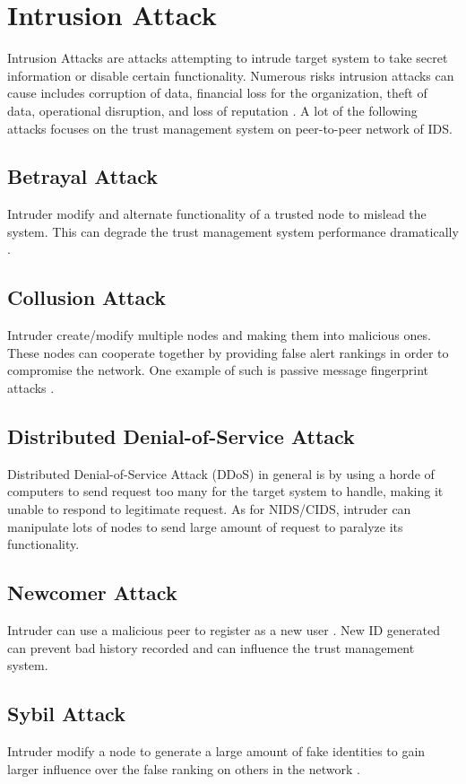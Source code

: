 \documentclass[12pt]{report}
\begin{document}
\section{Intrusion Attack}
Intrusion Attacks are attacks attempting to intrude target system to take secret information or disable certain functionality. Numerous risks intrusion attacks can cause includes corruption of data, financial loss for the organization, theft of data, operational disruption, and loss of reputation \cite{zenarmor_network_intrusion}. A lot of the following attacks focuses on the trust management system on peer-to-peer network of IDS.

\subsection{Betrayal Attack}
Intruder modify and alternate functionality of a trusted node to mislead the system. This can degrade the trust management system performance dramatically \cite{5188784}.

\subsection{Collusion Attack}
Intruder create/modify multiple nodes and making them into malicious ones. These nodes can cooperate together by providing false alert rankings in order to compromise the network. \cite{5188784} One example of such is passive message fingerprint attacks \cite{Li2016PMFATP}.

\subsection{Distributed Denial-of-Service Attack}
Distributed Denial-of-Service Attack (DDoS) in general is by using a horde of computers to send request too many for the target system to handle, making it unable to respond to legitimate request. As for NIDS/CIDS, intruder can manipulate lots of nodes to send large amount of request to paralyze its functionality.

\subsection{Newcomer Attack}
Intruder can use a malicious peer to register as a new user \cite{5188784}. New ID generated can prevent bad history recorded and can influence the trust management system.

\subsection{Sybil Attack}
Intruder modify a node to generate a large amount of fake identities to gain larger influence over the false ranking on others in the network \cite{5188784} \cite{10.1007/3-540-45748-8_24}.
\end{document}

